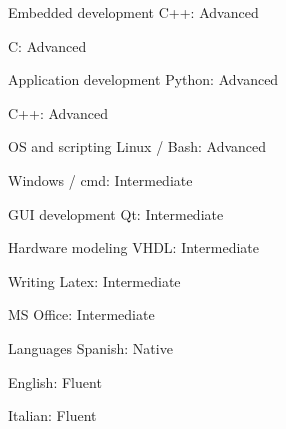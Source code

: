 

\begin{cvskills}

    \cvskill
    {Embedded development} %
    {C++: Advanced}

    \cvskill
    {}
    {C: Advanced}

    \cvskill
    {Application development}
    {Python: Advanced}

    \cvskill
    {}
    {C++: Advanced}

    \cvskill
    {OS and scripting}
    {Linux / Bash: Advanced}

    \cvskill
    {}
    {Windows / cmd: Intermediate}

    \cvskill
    {GUI development}
    {Qt: Intermediate}

    \cvskill
    {Hardware modeling}
    {VHDL: Intermediate}

    \cvskill
    {Writing}
    {Latex: Intermediate}

    \cvskill
    {}
    {MS Office: Intermediate}

    \cvskill
    {Languages}
    {Spanish: Native}

    \cvskill
    {}
    {English: Fluent}

    \cvskill
    {}
    {Italian: Fluent}

\end{cvskills}
